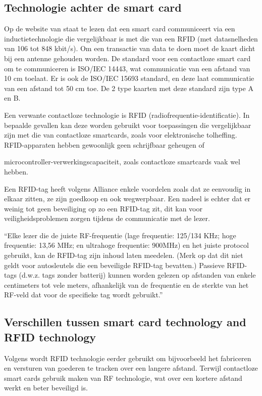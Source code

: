 \subsection{Technologie achter de smart card}
Op de website van \textcite{STASmartCard} staat te lezen dat een smart card communiceert via een inductietechnologie die vergelijkbaar is met die van een RFID (met datasnelheden van 106 tot 848 kbit/s). Om een transactie van data te doen moet de kaart dicht bij een antenne gehouden worden. De standard voor een contactloze smart card om te communiceren is ISO/IEC 14443, wat communicatie van een afstand van 10 cm toelaat. Er is ook de ISO/IEC 15693 standard, en deze laat communicatie van een afstand tot 50 cm toe. De 2 type kaarten met deze standard zijn type A en B. 

Een verwante contactloze technologie is RFID (radiofrequentie-identificatie). In bepaalde gevallen kan deze worden gebruikt voor toepassingen die vergelijkbaar zijn met die van contactloze smartcards, zoals voor elektronische tolheffing. RFID-apparaten hebben gewoonlijk geen schrijfbaar geheugen of 

microcontroller-verwerkingscapaciteit, zoals contactloze smartcards vaak wel hebben.

Een RFID-tag heeft volgens \textcite{STASmartCard} Alliance enkele voordelen zoals dat ze eenvoudig in elkaar zitten, ze zijn goedkoop en ook wegwerpbaar. Een nadeel is echter dat er weinig tot geen beveiliging op zo een RFID-tag zit, dit kan voor veiligheidsproblemen zorgen tijdens de communicatie met de lezer.

``Elke lezer die de juiste RF-frequentie (lage frequentie: 125/134 KHz; hoge frequentie: 13,56 MHz; en ultrahoge frequentie: 900MHz) en het juiste protocol gebruikt, kan de RFID-tag zijn inhoud laten meedelen. (Merk op dat dit niet geldt voor autosleutels die een beveiligde RFID-tag bevatten.) Passieve RFID-tags (d.w.z. tags zonder batterij) kunnen worden gelezen op afstanden van enkele centimeters tot vele meters, afhankelijk van de frequentie en de sterkte van het RF-veld dat voor de specifieke tag wordt gebruikt.''\autocite{STASmartCard}

\subsection{Verschillen tussen smart card technology and RFID technology}
Volgens \textcite{STASmartCard} wordt RFID technologie eerder gebruikt om bijvoorbeeld het fabriceren en versturen van goederen te tracken over een langere afstand. Terwijl contactloze smart cards gebruik maken van RF technologie, wat over een kortere afstand werkt en beter beveiligd is.

